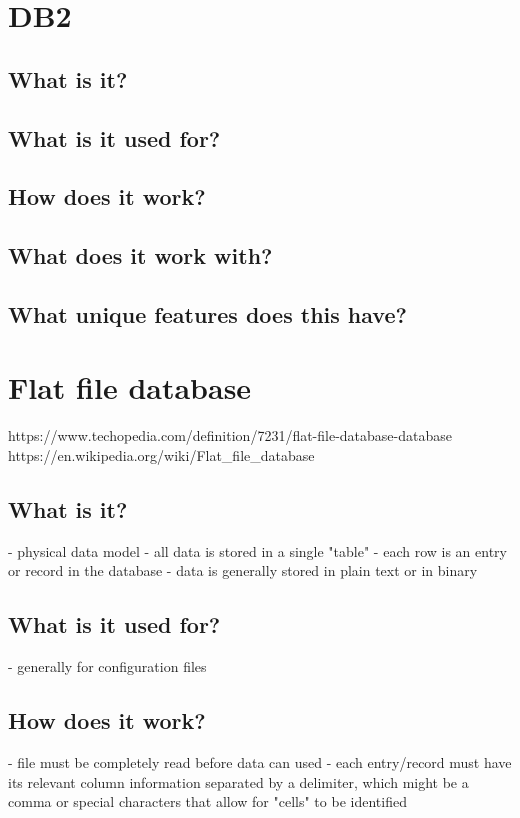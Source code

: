 \chapter{DB2}

\section{What is it?}

\section{What is it used for?}

\section{How does it work?}

\section{What does it work with?}

\section{What unique features does this have?}



\chapter{Flat file database}
https://www.techopedia.com/definition/7231/flat-file-database-database
https://en.wikipedia.org/wiki/Flat_file_database

\section{What is it?}
- physical data model
- all data is stored in a single "table"
- each row is an entry or record in the database
- data is generally stored in plain text or in binary

\section{What is it used for?}
- generally for configuration files

\section{How does it work?}
- file must be completely read before data can used
- each entry/record must have its relevant column information separated by a delimiter, which might be a comma or special characters that allow for "cells" to be identified

